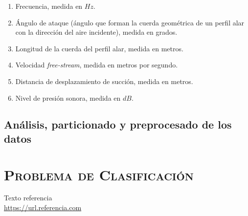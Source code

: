 \documentclass[11pt,a4paper]{article}
\begin{document}
\begin{enumerate}
	\item Frecuencia, medida en $Hz$.
	\item Ángulo de ataque (ángulo que forman la cuerda geométrica de un perfil alar con la dirección del aire incidente),
		  medida en grados.
	\item Longitud de la cuerda del perfil alar, medida en metros.
	\item Velocidad \textit{free-stream}, medida en metros por segundo. 
	\item Distancia de desplazamiento de succión, medida en metros.
	\item Nivel de presión sonora, medida en $dB$.
\end{enumerate}

\subsection{Análisis, particionado y preprocesado de los datos}

\newpage

\section{\textsc{Problema de Clasificación}}

\newpage

\begin{thebibliography}{5}

Texto referencia
\\\url{https://url.referencia.com}

\end{thebibliography}
\end{document}
